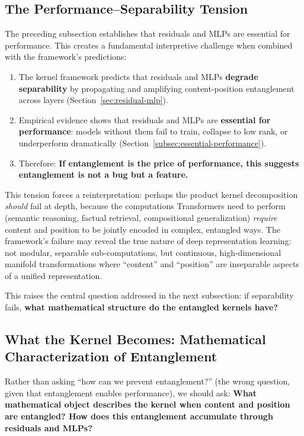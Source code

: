 \documentclass[11pt]{article}
\theoremstyle{definition}
\begin{document}
\subsection{The Performance--Separability Tension}
\label{subsec:performance-entanglement-tension}

The preceding subsection establishes that residuals and MLPs are essential for performance. This creates a fundamental interpretive challenge when combined with the framework's predictions:

\begin{enumerate}
    \item The kernel framework predicts that residuals and MLPs \textbf{degrade separability} by propagating and amplifying content-position entanglement across layers (Section~\ref{sec:residual-mlp}).
    \item Empirical evidence shows that residuals and MLPs are \textbf{essential for performance}: models without them fail to train, collapse to low rank, or underperform dramatically (Section~\ref{subsec:essential-performance}).
    \item Therefore: \textbf{If entanglement is the price of performance, this suggests entanglement is not a bug but a feature.}
\end{enumerate}

This tension forces a reinterpretation: perhaps the product kernel decomposition \emph{should} fail at depth, because the computations Transformers need to perform (semantic reasoning, factual retrieval, compositional generalization) \emph{require} content and position to be jointly encoded in complex, entangled ways. The framework's failure may reveal the true nature of deep representation learning: not modular, separable sub-computations, but continuous, high-dimensional manifold transformations where ``content'' and ``position'' are inseparable aspects of a unified representation.

This raises the central question addressed in the next subsection: if separability fails, \textbf{what mathematical structure do the entangled kernels have?}

\subsection{What the Kernel Becomes: Mathematical Characterization of Entanglement}
\label{subsec:kernel-becomes}

Rather than asking ``how can we prevent entanglement?'' (the wrong question, given that entanglement enables performance), we should ask: \textbf{What mathematical object describes the kernel when content and position are entangled? How does this entanglement accumulate through residuals and MLPs?}
\end{document}
